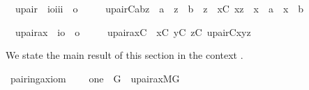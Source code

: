 \begin{isabelle}
\isamarkupfalse%
\isanewline
\ \ upair\ {\isacharcolon}{\isacharcolon}\ {\isachardoublequoteopen}{\isacharbrackleft}i{\isasymRightarrow}o{\isacharcomma}i{\isacharcomma}i{\isacharcomma}i{\isacharbrackright}\ {\isasymRightarrow}\ o{\isachardoublequoteclose}\ \isanewline
\ \ \ \ {\isachardoublequoteopen}upair{\isacharparenleft}C{\isacharcomma}a{\isacharcomma}b{\isacharcomma}z{\isacharparenright}\ {\isacharequal}{\isacharequal}\ a\ {\isasymin}\ z\ {\isasymand}\ b\ {\isasymin}\ z\ {\isasymand}\ {\isacharparenleft}{\isasymforall}x{\isacharbrackleft}C{\isacharbrackright}{\isachardot}\ x{\isasymin}z\ {\isasymlongrightarrow}\ x\ {\isacharequal}\ a\ {\isasymor}\ x\ {\isacharequal}\ b{\isacharparenright}{\isachardoublequoteclose}
\end{isabelle}
%
%
\begin{isabelle}
\isamarkupfalse%
\isanewline
\ \ upair{\isacharunderscore}ax\ {\isacharcolon}{\isacharcolon}\ {\isachardoublequoteopen}{\isacharparenleft}i{\isasymRightarrow}o{\isacharparenright}\ {\isasymRightarrow}\ o{\isachardoublequoteclose}\ \isanewline
\ \ \ \ {\isachardoublequoteopen}upair{\isacharunderscore}ax{\isacharparenleft}C{\isacharparenright}\ {\isacharequal}{\isacharequal}\ {\isasymforall}x{\isacharbrackleft}C{\isacharbrackright}{\isachardot}\ {\isasymforall}y{\isacharbrackleft}C{\isacharbrackright}{\isachardot}\ {\isasymexists}z{\isacharbrackleft}C{\isacharbrackright}{\isachardot}\ upair{\isacharparenleft}C{\isacharcomma}x{\isacharcomma}y{\isacharcomma}z{\isacharparenright}{\isachardoublequoteclose}
\end{isabelle}



We state the main result of this section in the context
.
%
\begin{isabelle}
\isamarkupfalse%
\ pairing{\isacharunderscore}axiom\ {\isacharcolon}\ \isanewline
\ \ {\isachardoublequoteopen}one\ {\isasymin}\ G\ {\isasymLongrightarrow}\ upair{\isacharunderscore}ax{\isacharparenleft}{\isacharhash}{\isacharhash}M{\isacharbrackleft}G{\isacharbrackright}{\isacharparenright}{\isachardoublequoteclose}
\end{isabelle}


